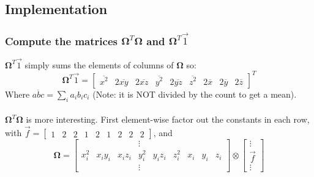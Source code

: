 \documentclass{article}
\def\mat#1{\mathbf{#1}}
\begin{document}
\subsection{Implementation}
\subsubsection{ Compute the matrices $\mat{\Omega}^T \mat{\Omega}$ and $\mat{\Omega}^T \vec{1}$ }
$\mat{\Omega}^T \vec{1}$ simply sums the elements of columns of $\mat{\Omega}$ so:
\begin{equation}
\mat{\Omega}^T \vec{1} =  \left[ \begin{matrix}
\overline { x^2 } &
2\overline { x y } &
2\overline { x z } &
\overline { y^2 } &
2\overline { y z } &
\overline { z^2 } &
2\overline { x } &
2\overline { y } &
2\overline { z }
\end{matrix}\right]^T
\end{equation}
Where $\overline{abc} = \sum_i a_i b_i c_i$ (Note: it is NOT divided by the count to get a mean).
\\
\\
$\mat{\Omega}^T\mat{\Omega}$ is more interesting. First element-wise factor out the constants in 
each row, with
$\vec{f} = 
\left[ \begin{matrix}
1 & 2 & 2 & 1 & 2 & 1 & 2 & 2 & 2
\end{matrix}\right]$, and
\begin{equation}
\mat{\Omega} = \left[ \begin{matrix}
& & & \vdots \\
x_i^2 & x_iy_i & x_iz_i & y_i^2 & y_iz_i & z_i^2 & x_i & y_i & z_i \\
& & & \vdots  
\end{matrix}\right] \otimes \left[\begin{matrix} \vdots\\ \vec{f} \\ \vdots \end{matrix}\right]
\end{equation}
\end{document}
